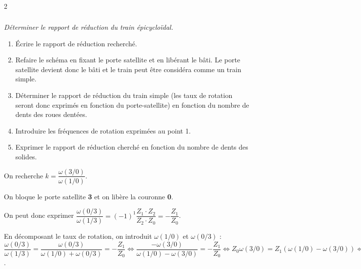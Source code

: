 \documentclass[10pt,fleqn]{article} %
\begin{document}
\begin{multicols}{2}

\subparagraph{}
\textit{Déterminer le rapport de réduction du train épicycloïdal.}
\ifprof
\begin{corrige}
\begin{methode}
\begin{enumerate}
\item Écrire le rapport de réduction recherché.
\item Refaire le schéma en fixant le porte satellite et en libérant le bâti. Le porte satellite devient donc le bâti et le train peut être considéra comme un train simple.
\item Déterminer le rapport de réduction du train simple (les taux de rotation seront donc exprimés en fonction du porte-satellite) en fonction du nombre de dents des roues dentées.
\item Introduire les fréquences de rotation exprimées au point 1.
\item Exprimer le rapport de réduction cherché en fonction du  nombre de dents des solides. 
\end{enumerate}
\end{methode}


\begin{minipage}[c]{.6\linewidth}
On recherche $k=\dfrac{\omega(3/0)}{\omega(1/0)}$. 

On bloque le porte satellite \textbf{3} et on libère la couronne \textbf{0}. 

On peut donc exprimer $ \dfrac{\omega(0/3)}{\omega(1/3)} = (-1)^1\dfrac{Z_1\cdot Z_2}{Z_2\cdot Z_0} = -\dfrac{Z_1}{Z_0}$.

En décomposant le taux de rotation, on introduit $\omega(1/0)$ et $\omega(0/3)$ :
$ \dfrac{\omega(0/3)}{\omega(1/3)} =  \dfrac{\omega(0/3)}{\omega(1/0)+\omega(0/3)} = -\dfrac{Z_1}{Z_0} 
\Leftrightarrow \dfrac{-\omega(3/0)}{\omega(1/0)-\omega(3/0)}  =-\dfrac{Z_1}{Z_0}  \Leftrightarrow {Z_0} \omega(3/0)  =Z_1 \left( \omega(1/0)-\omega(3/0)\right) 
\Leftrightarrow  \omega(3/0) \left(Z_0 + Z_1\right) =Z_1 \omega(1/0) 
\Leftrightarrow \dfrac{\omega(3/0)}{\omega(1/0)} = \dfrac{Z_1}{Z_1+Z_0}$.


\end{minipage}
\end{corrige}
\end{multicols}
\end{document}
